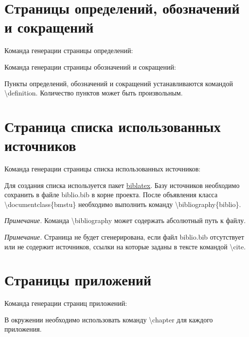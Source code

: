 \documentclass{bmstu}
\begin{document}
\section{Страницы определений, обозначений и сокращений}
Команда генерации страницы определений:

Команда генерации страницы обозначений и сокращений:

Пункты определений, обозначений и сокращений устанавливаются командой {\ttfamily \textbackslash definition}. Количество пунктов может быть произвольным.

\section{Страница списка использованных источников}
Команда генерации страницы списка использованных источников:

Для создания списка используется пакет \href{https://www.ctan.org/pkg/biblatex}{biblatex}. Базу источников необходимо сохранить в файле {\ttfamily biblio.bib} в корне проекта. После объявления класса {\ttfamily \textbackslash documentclass\{bmstu\}} необходимо выполнить команду {\ttfamily  \textbackslash bibliography\{biblio\}}.

\textit{Примечание.} Команда {\ttfamily  \textbackslash bibliography} может содержать абсолютный путь к файлу.

\textit{Примечание.} Страница не будет сгенерирована, если файл {\ttfamily biblio.bib} отсутствует или не содержит источников, ссылки на которые заданы в тексте командой {\ttfamily \textbackslash cite}.

\section{Страницы приложений}

Команда генерации страниц приложений:

В окружении необходимо использовать команду {\ttfamily \textbackslash chapter} для каждого приложения.
\end{document}
